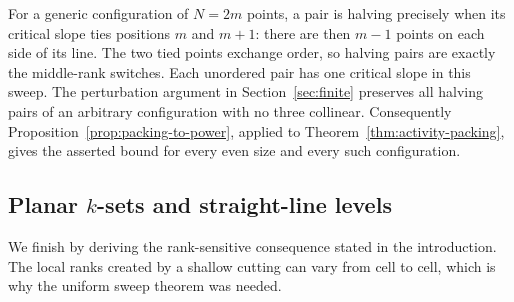 For a generic configuration of $N=2m$ points, a pair is halving
precisely when its critical slope ties positions $m$ and $m+1$:
there are then $m-1$ points on each side of its line. The two tied
points exchange order, so halving pairs are exactly the middle-rank
switches. Each unordered pair has one critical slope in this sweep.
The perturbation argument in Section~\ref{sec:finite} preserves all
halving pairs of an arbitrary configuration with no three collinear. Consequently
Proposition~\ref{prop:packing-to-power}, applied to Theorem~\ref{thm:activity-packing}, gives the asserted bound for every even
size and every such configuration.

\subsection{Planar \texorpdfstring{$k$}{k}-sets and straight-line levels}
\label{sec:k-sensitive-proof}

We finish by deriving the rank-sensitive consequence stated in the
introduction. The local ranks created by a shallow cutting can vary from
cell to cell, which is why the uniform sweep theorem was needed.

